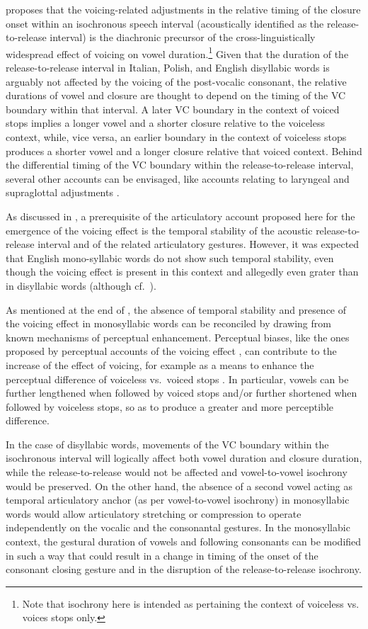 \documentclass[12pt,a4paper,]{article}
\begin{document}
\citet{coretta2019k} proposes that the voicing-related adjustments in
the relative timing of the closure onset within an isochronous speech
interval (acoustically identified as the release-to-release interval) is
the diachronic precursor of the cross-linguistically widespread effect
of voicing on vowel
duration.\footnote{Note that isochrony here is intended as pertaining the context of voiceless vs. voices stops only.}
Given that the duration of the release-to-release interval in Italian,
Polish, and English disyllabic words is arguably not affected by the
voicing of the post-vocalic consonant, the relative durations of vowel
and closure are thought to depend on the timing of the VC boundary
within that interval. A later VC boundary in the context of voiced stops
implies a longer vowel and a shorter closure relative to the voiceless
context, while, vice versa, an earlier boundary in the context of
voiceless stops produces a shorter vowel and a longer closure relative
that voiced context. Behind the differential timing of the VC boundary
within the release-to-release interval, several other accounts can be
envisaged, like accounts relating to laryngeal and supraglottal
adjustments \citep{halle1967, begus2017, coretta2019c}.

As discussed in , a prerequisite of the articulatory
account proposed here for the emergence of the voicing effect is the
temporal stability of the acoustic release-to-release interval and of
the related articulatory gestures. However, it was expected that English
mono-syllabic words do not show such temporal stability, even though the
voicing effect is present in this context and allegedly even grater than
in disyllabic words (although cf.~).

As mentioned at the end of , the absence of temporal
stability and presence of the voicing effect in monosyllabic words can
be reconciled by drawing from known mechanisms of perceptual
enhancement. Perceptual biases, like the ones proposed by perceptual
accounts of the voicing effect
\citep{javkin1976, kluender1988, sanker2019}, can contribute to the
increase of the effect of voicing, for example as a means to enhance the
perceptual difference of voiceless vs.~voiced stops
\citep{lisker1974, lisker1986, stevens1989}. In particular, vowels can
be further lengthened when followed by voiced stops and/or further
shortened when followed by voiceless stops, so as to produce a greater
and more perceptible difference.

In the case of disyllabic words, movements of the VC boundary within the
isochronous interval will logically affect both vowel duration and
closure duration, while the release-to-release would not be affected and
vowel-to-vowel isochrony would be preserved. On the other hand, the
absence of a second vowel acting as temporal articulatory anchor (as per
vowel-to-vowel isochrony) in monosyllabic words would allow articulatory
stretching or compression to operate independently on the vocalic and
the consonantal gestures. In the monosyllabic context, the gestural
duration of vowels and following consonants can be modified in such a
way that could result in a change in timing of the onset of the
consonant closing gesture and in the disruption of the
release-to-release isochrony.
\end{document}
